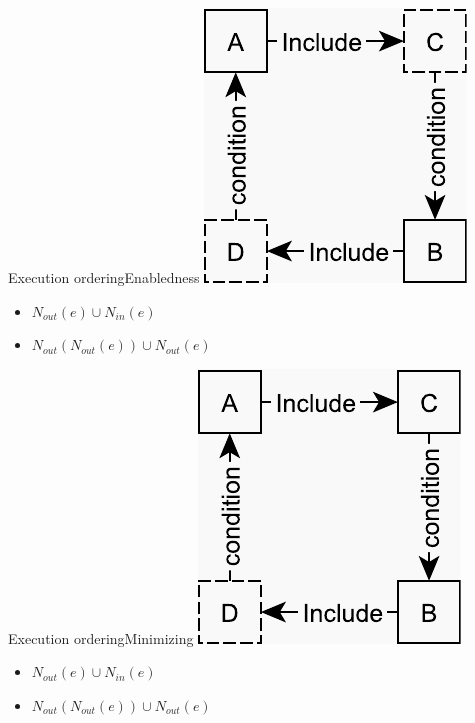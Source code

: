 \documentclass{beamer}
\begin{document}
\begin{frame}{Execution ordering}{Enabledness}%
	\centering
    \includegraphics[scale=0.5]{figures/second-degree-effect.pdf}
    \vspace{\fill}
    \begin{itemize}
    	\item $N_{out}(e) \cup N_{in}(e)$
    	\item $N_{out}(N_{out}(e)) \cup N_{out}(e)$
    \end{itemize}
\end{frame}

\begin{frame}{Execution ordering}{Minimizing}%
	\centering
    \includegraphics[scale=0.5]{figures/second-degree-no-effect.pdf}
    \vspace{\fill}
    \begin{itemize}
    	\item $N_{out}(e) \cup N_{in}(e)$
    	\item $N_{out}(N_{out}(e)) \cup N_{out}(e)$
    \end{itemize}
\end{frame}
\end{document}
